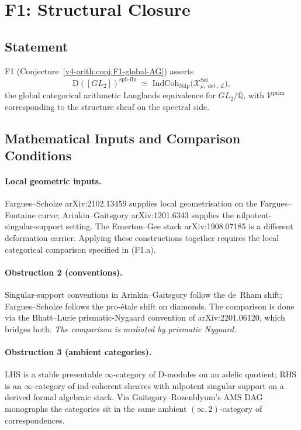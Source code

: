 \section{F1: Structural Closure}
\label{v4-arith:cl:F1-closure}

\subsection{Statement}

F1 (Conjecture~\ref{v4-arith:conj:F1-global-AG}) asserts
\begin{equation}
\label{v4-arith:cl:eq:F1-statement}
\mathrm{D}([GL_{2}])^{\mathrm{sph\text{-}fin}}\;\simeq\;\mathrm{IndCoh}_{\mathrm{Nilp}}\bigl(\mathcal{X}^{\mathrm{Sel}}_{\bar\rho,\det,\mathcal{L}}\bigr),
\end{equation}
the global categorical arithmetic Langlands equivalence for
\(GL_{2}/\mathbb{Q}\), with \(\mathcal{V}^{\mathrm{prim}}\)
corresponding to the structure sheaf on the spectral side.

\subsection{Mathematical Inputs and Comparison Conditions}

\paragraph{Local geometric inputs.}
Fargues--Scholze arXiv:2102.13459 supplies local geometrisation on the
Fargues--Fontaine curve; Arinkin--Gaitsgory arXiv:1201.6343 supplies
the nilpotent-singular-support setting. The Emerton--Gee stack
arXiv:1908.07185 is a different deformation carrier. Applying these
constructions together requires the local categorical comparison
specified in (F1.a).

\paragraph{Obstruction 2 (conventions).} Singular-support conventions
in Arinkin--Gaitsgory follow the de~Rham shift; Fargues--Scholze
follows the pro-\'etale shift on diamonds. The comparison is
done via the Bhatt--Lurie prismatic-Nygaard convention of
arXiv:2201.06120, which bridges both. \emph{The comparison is mediated by prismatic Nygaard.}

\paragraph{Obstruction 3 (ambient categories).} LHS is a stable
presentable \(\infty\)-category of D-modules on an adelic quotient;
RHS is an \(\infty\)-category of ind-coherent sheaves with nilpotent
singular support on a derived formal algebraic stack. Via
Gaitsgory--Rozenblyum's AMS DAG monographs the categories sit
in the same ambient \((\infty,2)\)-category of correspondences.

